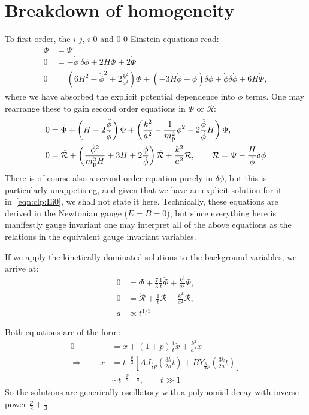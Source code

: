 \section{Breakdown of homogeneity}
To first order, the $i$-$j$, $i$-$0$ and $0$-$0$ Einstein equations read:
\begin{align}
  \Phi &= \Psi 
  \label{eqn:clp:Eij} \\
  0 &= -\dot{\phi}\:\delta\phi  + 2 H \Phi + 2 \dot{\Phi} 
  \label{eqn:clp:Ei0}\\
  0 &= \left(6H^2-\dot{\phi}^2 + 2\frac{k^2}{a^2}\right)\Phi  + \left( -3H\dot{\phi} - \ddot{\phi} \right)\delta\phi + \dot{\phi}\delta\dot{\phi} +  6 H \dot{\Phi},
  \label{eqn:clp:E00}
\end{align}
where we have absorbed the explicit potential dependence into $\ddot{\phi}$ terms. 
One may rearrange these to gain second order equations in $\Phi$ or $\mathcal{R}$:
\begin{align}
  0 &= \ddot{\Phi} + \left( H - 2 \frac{\ddot{\phi}}{\dot{\phi}} \right) \dot{\Phi} + \left( \frac{k^2}{a^2}-\frac{1}{m_{\mathrm{p}}^2}\dot{\phi}^2 - 2\frac{\ddot{\phi}}{\dot{\phi}}H \right)\Phi, \\
  0 &= \ddot{\mathcal{R}} + \left( \frac{\dot{\phi}^2}{m_{\mathrm{p}}^2H} + 3H + 2\frac{\ddot{\phi}}{\dot{\phi}} \right)\dot{\mathcal{R}} + \frac{k^2}{a^2}\mathcal{R}, \qquad \mathcal{R} = \Psi - \frac{H}{\dot{\phi}}\delta\phi
\end{align}
There is of course also a second order equation purely in $\delta\phi$, but this is particularly unappetising, and given that we have an explicit solution for it in~\eqref{eqn:clp:Ei0}, we shall not state it here.
Technically, these equations are derived in the Newtonian gauge ($E=B=0$), but since everything here is manifestly gauge invariant one may interpret all of the above equations as the relations in the equivalent gauge invariant variables.

If we apply the kinetically dominated solutions to the background variables, we arrive at:
\begin{align}
  0 &= \ddot{\Phi} + \frac{7}{3}\frac{1}{t}\dot{\Phi} + \frac{k^2}{a^2} \Phi,\\
  0 &= \ddot{\mathcal{R}} + \frac{1}{t}\dot{\mathcal{R}} + \frac{k^2}{a^2} \mathcal{R},\\
  a &\propto t^{1/3}
\end{align}

Both equations are of the form:
\begin{align}
  0 &=\ddot{x} + (1+p)\frac{1}{t}\dot{x} + \frac{k^2}{a^2} x  \\
  \Rightarrow \qquad
  x &= t^{-\frac{p}{2}}\left[ A J_{\frac{3}{4}p}\left( \frac{3k}{2a} t \right) + B Y_{\frac{3}{4}p}\left( \frac{3k}{2a} t \right) \right] \\
  &\sim  t^{-\frac{p}{2}-\frac{1}{3}}, \qquad t \gg 1
\end{align}
So the solutions are generically oscillatory with a polynomial decay with inverse power $\frac{p}{2} + \frac{1}{3}$.

